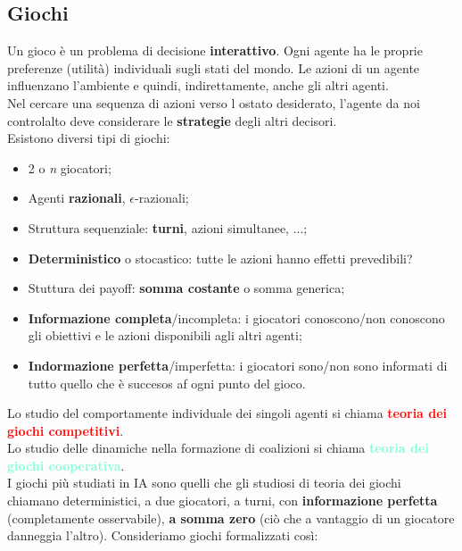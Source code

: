 \documentclass{article}
\begin{document}
\subsection{Giochi}
Un gioco è un problema di decisione \textbf{interattivo}. Ogni agente ha le proprie preferenze (utilità) individuali sugli stati del mondo. Le azioni di un agente influenzano l'ambiente e quindi, indirettamente, 
anche gli altri agenti. \\ Nel cercare una sequenza di azioni verso l ostato desiderato, l'agente da noi controlalto deve considerare le \textbf{strategie} degli altri decisori.
\\ Esistono diversi tipi di giochi:
\begin{itemize}
    \item 2 o \textit{n} giocatori;
    \item Agenti \textbf{razionali}, $\epsilon$-razionali;
    \item Struttura sequenziale: \textbf{turni}, azioni simultanee, ...;
    \item \textbf{Deterministico} o stocastico: tutte le azioni hanno effetti prevedibili?
    \item Stuttura dei payoff: \textbf{somma costante} o somma generica;
    \item \textbf{Informazione completa}/incompleta: i giocatori conoscono/non conoscono gli obiettivi e le azioni disponibili agli altri agenti;
    \item \textbf{Indormazione perfetta}/imperfetta: i giocatori sono/non sono informati di tutto quello che è succesos af ogni punto del gioco.
\end{itemize}
Lo studio del comportamente individuale dei singoli agenti si chiama \textcolor{red}{\textbf{teoria dei giochi competitivi}}.
\\Lo studio delle dinamiche nella formazione di coalizioni si chiama \textcolor{Aquamarine}{\textbf{teoria dei giochi cooperativa}}.
\\I giochi più studiati in IA sono quelli che gli studiosi di teoria dei giochi chiamano deterministici, a due giocatori, a turni, con \textbf{informazione perfetta} (completamente osservabile), \textbf{a somma zero} (ciò che a vantaggio di un giocatore danneggia l'altro).
\newpage
Consideriamo giochi formalizzati così:
\end{document}
